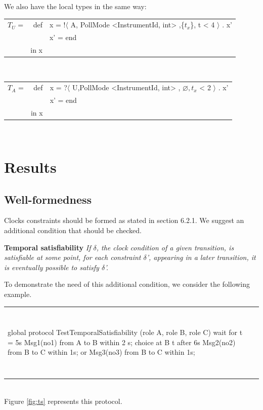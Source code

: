 \documentclass[a4paper,11pt,twoside]{report}
\begin{document}
We also have the local types in the same way:\\
\begin{tabular}{lrl}
$T_{U}$ = & def &  x  = !$\langle$ A, PollMode <InstrumentId, int>  ,\{$t_{x}$\}, t < 4 $\rangle$ . x’\\
&& x’ = end\\
& in x&\\
\end{tabular}\\
\begin{tabular}{lrl}
$T_{A}$ = & def &  x  = ?$\langle$ U,PollMode <InstrumentId, int>  , $\varnothing, t_{x}$ < 2 $\rangle$ . x’\\
&& x’ = end\\
& in x&\\
\end{tabular}\\



\section{Results}

\subsection{Well-formedness}
Clocks constraints should be formed as stated in section 6.2.1. We suggest an additional condition that should be checked.

\textbf{Temporal satisfiability }\textit{ If $\delta$, the clock condition of a given transition, is satisfiable at some point, for each constraint $\delta$', appearing in a later transition, it is eventually possible to satisfy $\delta$'.}

To demonstrate the need of this additional condition, we consider the following example.\\
\begin{tabular}{ll}
~&~\\
\begin{SJLISTING}
global protocol TestTemporalSatisfiability (role A, role B, role C) {
	wait for t = 5s
	Msg1(no1) from A to B within 2 s;
	choice at B {
		t after 6s
		Msg2(no2) from B to C within 1s;
	} or {
		Msg3(no3) from B to C within 1s;
	}
}
\end{SJLISTING}
&\\
~&~\\
\end{tabular}\\
Figure \ref{fig:ts} represents this protocol.
\end{document}
